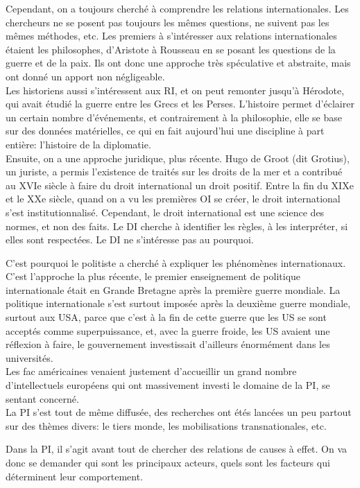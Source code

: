 \documentclass[10pt, a4paper, openany]{book}
\begin{document}
Cependant, on a toujours cherché à comprendre les relations internationales. Les chercheurs ne se posent pas toujours les mêmes questions, ne suivent pas les mêmes méthodes, etc. Les premiers à s'intéresser aux relations internationales étaient les philosophes, d'Aristote à Rousseau en se posant les questions de la guerre et de la paix. Ils ont donc une approche très spéculative et abstraite, mais ont donné un apport non négligeable. \\
Les historiens aussi s'intéressent aux RI, et on peut remonter jusqu'à Hérodote, qui avait étudié la guerre entre les Grecs et les Perses. L'histoire permet d'éclairer un certain nombre d'événements, et contrairement à la philosophie, elle se base sur des données matérielles, ce qui en fait aujourd'hui une discipline à part entière: l'histoire de la diplomatie. \\
Ensuite, on a une approche juridique, plus récente. Hugo de Groot (dit Grotius), un juriste, a permis l'existence de traités sur les droits de la mer et a contribué au XVIe siècle à faire du droit international un droit positif. Entre la fin du XIXe et le XXe siècle, quand on a vu les premières OI se créer, le droit international s'est institutionnalisé. Cependant, le droit international est une science des normes, et non des faits. Le DI cherche à identifier les règles, à les interpréter, si elles sont respectées. Le DI ne s'intéresse pas au pourquoi.


C'est pourquoi le politiste a cherché à expliquer les phénomènes internationaux. C'est l'approche la plus récente, le premier enseignement de politique internationale était en Grande Bretagne après la première guerre mondiale. La politique internationale s'est surtout imposée après la deuxième guerre mondiale, surtout aux USA, parce que c'est à la fin de cette guerre que les US se sont acceptés comme superpuissance, et, avec la guerre froide, les US avaient une réflexion à faire, le gouvernement investissait d'ailleurs énormément dans les universités. \\
Les fac américaines venaient justement d'accueillir un grand nombre d'intellectuels européens qui ont massivement investi le domaine de la PI, se sentant concerné. \\
La PI s'est tout de même diffusée, des recherches ont étés lancées un peu partout sur des thèmes divers: le tiers monde, les mobilisations transnationales, etc.


Dans la PI, il s'agit avant tout de chercher des relations de causes à effet. On va donc se demander qui sont les principaux acteurs, quels sont les facteurs qui déterminent leur comportement. 
\end{document}
